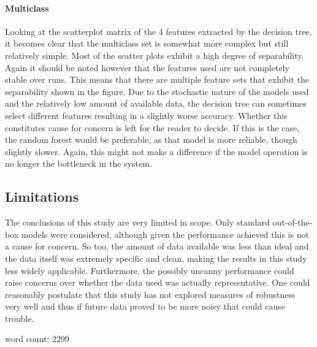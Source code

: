 \documentclass[british]{article}
\begin{document}
	\paragraph{Multiclass} Looking at the scatterplot matrix of the 4 features extracted by the decision tree, it becomes clear that the multiclass set is somewhat more complex but still relatively simple. Most of the scatter plots exhibit a high degree of separability. Again it should be noted however that the features used are not completely stable over runs. This means that there are multiple feature sets that exhibit the separability shown in the figure. Due to the stochastic nature of the models used and the relatively low amount of available data, the decision tree can sometimes select different features resulting in a slightly worse accuracy. Whether this constitutes cause for concern is left for the reader to decide. If this is the case, the random forest would be preferable, as that model is more reliable, though slightly slower. Again, this might not make a difference if the model operation is no longer the bottleneck in the system.     
	
	\subsection{Limitations}
	The conclusions of this study are very limited in scope. Only standard out-of-the-box models were considered, although given the performance achieved this is not a cause for concern. So too, the amount of data available was less than ideal and the data itself was extremely specific and clean, making the results in this study less widely applicable. Furthermore, the possibly uncanny performance could raise concerns over whether the data used was actually representative. One could reasonably postulate that this study has not explored measures of robustness very well and thus if future data proved to be more noisy that could cause trouble.
	
	
	word count:  2299
	\printbibliography
\end{document}
